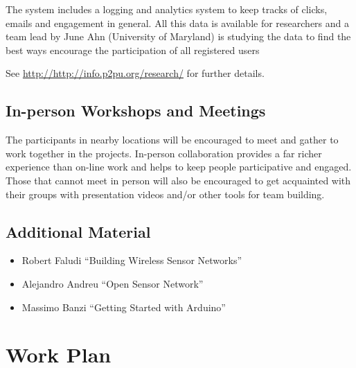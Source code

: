 \documentclass[a4paper,oneside]{book}   %
\begin{document}
The system includes a logging and analytics system to keep tracks of clicks, emails and engagement in general.
All this data is available for researchers and a team lead by June Ahn (University of Maryland) is studying the data to find the best ways encourage the participation of all registered users \cite{ahn2013dop}

See \url{http://http://info.p2pu.org/research/} for further details.

\subsection{In-person Workshops and Meetings}

The participants in nearby locations will be encouraged to meet and gather to work together in the projects.
In-person collaboration provides a far richer experience than on-line work and helps to keep people participative and engaged.
Those that cannot meet in person will also be encouraged to get acquainted with their groups with presentation videos and/or other tools for team building.

\subsection{Additional Material}

\begin{itemize}
\item Robert Faludi ``Building Wireless Sensor Networks'' \cite{faludi2010bws}
\item Alejandro Andreu ``Open Sensor Network'' \cite{andreu2013osn}
\item Massimo Banzi ``Getting Started with Arduino'' \cite{banzi2009gsa}
\end{itemize}



\section{Work Plan}
\end{document}
